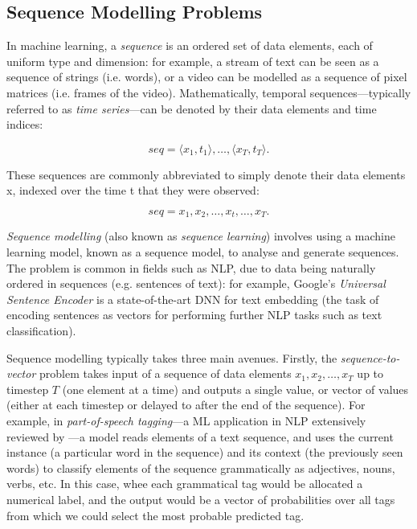 \documentclass[a4paper, 11pt]{report}
\begin{document}
    \subsection{Sequence Modelling Problems}

    In machine learning, a \emph{sequence} is an ordered set of data elements, each of uniform type and dimension: for example, a stream of text can be seen as a sequence of strings (i.e. words), or a video can be modelled as a sequence of pixel matrices (i.e. frames of the video). Mathematically, temporal sequences---typically referred to as \emph{time series}---can be denoted by their data elements and time indices: 

    \begin{equation}
        \label{eq: timeseries-full}
        seq = \langle x_1, t_1 \rangle, \ldots, \langle x_T, t_T \rangle 
        \text{.}
    \end{equation}

    These sequences are commonly abbreviated to simply denote their data elements x, indexed over the time t that they were observed:

    \begin{equation}
        \label{eq: timeseries}
        seq = x_1, x_2, \ldots, x_t, \ldots, x_T
        \text{.}
    \end{equation}

    \emph{Sequence modelling} (also known as \emph{sequence learning}) involves using a machine learning model, known as a sequence model, to analyse and generate sequences. The problem is common in fields such as NLP, due to data being naturally ordered in sequences (e.g. sentences of text): for example, Google's \emph{Universal Sentence Encoder} \citep{cer-2018} is a state-of-the-art DNN for text embedding (the task of encoding sentences as vectors for performing further NLP tasks such as text classification).

    Sequence modelling typically takes three main avenues. Firstly, the \emph{sequence-to-vector} problem takes input of a sequence of data elements $x_1, x_2, \ldots, x_T$ up to timestep $T$ (one element at a time) and outputs a single value, or vector of values (either at each timestep or delayed to after the end of the sequence). For example, in \emph{part-of-speech tagging}---a ML application in NLP extensively reviewed by \citet{chiche-2022}---a model reads elements of a text sequence, and uses the current instance (a particular word in the sequence) and its context (the previously seen words) to classify elements of the sequence grammatically as adjectives, nouns, verbs, etc. In this case, whee each grammatical tag would be allocated a numerical label, and the output would be a vector of probabilities over all tags from which we could select the most probable predicted tag.
\end{document}

